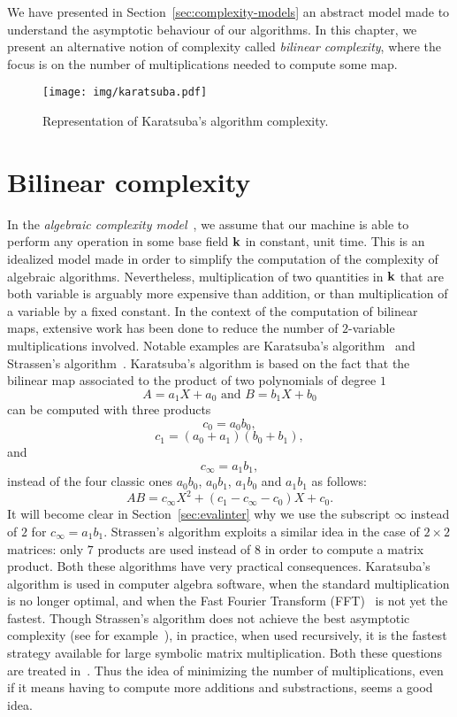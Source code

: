 We have presented in Section~\ref{sec:complexity-models} an abstract model made
to understand the asymptotic behaviour of our algorithms. In this chapter, we
present an alternative notion of complexity called \emph{bilinear complexity},
where the focus is on the number of multiplications needed to compute some map.
\minitoc

\begin{figure}[h]
  \centering
  \texttt{[image: img/karatsuba.pdf]}
  \caption{Representation of Karatsuba's algorithm complexity.}
  \label{fig:karatsuba}
\end{figure}
\clearpage

\section{Bilinear complexity}

In the \emph{algebraic complexity model}~\cite{BCS13}, we assume that our
machine is able to perform any operation in some base field $\mathbf{k}$ in constant,
unit time. This is an idealized model made in order to simplify the
computation of the complexity of algebraic algorithms. Nevertheless,
multiplication of two quantities in $\mathbf{k}$ that are both variable is arguably more
expensive
than addition, or than multiplication of a variable by a fixed constant. In the
context of the computation of bilinear maps, extensive work has been done to
reduce the number of $2$-variable multiplications involved. Notable examples are
Karatsuba's algorithm~\cite{Karatsuba63} and
Strassen's algorithm~\cite{Strassen69}. Karatsuba's algorithm is
based on the fact that the bilinear map associated to the product of two
polynomials of degree $1$
\[
  A = a_1 X + a_0\text{ and }B = b_1 X + b_0
\]
can be computed with three products
\[
  c_0 = a_0b_0,
\]
\[
  c_1 = (a_0+a_1)(b_0+b_1),
\]
and
\[
  c_\infty = a_1b_1,
\]
instead
of the four classic ones $a_0b_0$, $a_0b_1$, $a_1b_0$ and $a_1b_1$ as follows:
\[
  AB = c_\infty X^2 + (c_1-c_\infty-c_0) X + c_0.
\]
It will become clear in Section~\ref{sec:evalinter} why we use the subscript
$\infty$ instead of $2$ for $c_\infty = a_1b_1$. Strassen's algorithm
exploits a similar idea in the case of $2\times2$ matrices: only $7$ products
are used instead of $8$ in order to compute a matrix product. Both these
algorithms have very practical consequences. Karatsuba's algorithm is used in
computer algebra software, when the standard multiplication is no longer
optimal, and when the Fast Fourier Transform (FFT)~\cite{CT65, SS71} is not yet
the fastest. Though Strassen's algorithm does not achieve the best asymptotic
complexity (see for example~\cite{CW90, AW21}), in practice, when used
recursively, it is the fastest strategy available for large symbolic matrix
multiplication. Both these questions are treated in~\cite{GG13}. Thus the idea
of minimizing the number of multiplications, even if it means having to compute
more additions and substractions, seems a good idea.

